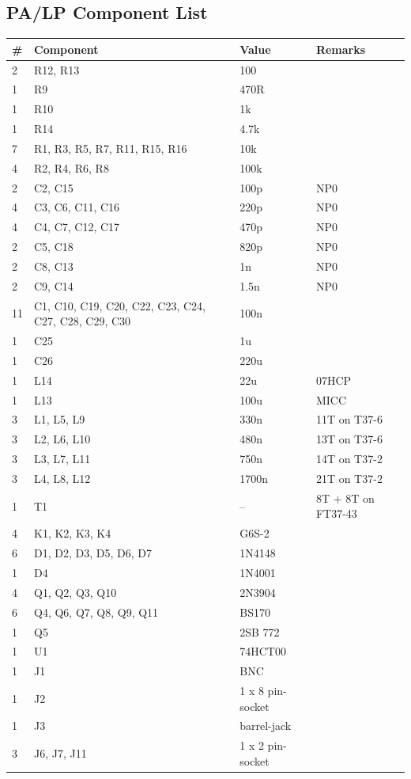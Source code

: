 \documentclass[10pt, a4paper,twoside]{scrartcl}
\begin{document}
\subsection{PA/LP Component List}  \label{sec:pacomp}
\begin{longtable}{|l|p{6cm}|l|l|} \hline 
\# & Component & Value & Remarks \\ \hline 
2 & R12, R13 & 100 & \\
1 & R9 & 470R & \\
1 & R10 & 1k & \\
1 & R14 & 4.7k & \\
7 & R1, R3, R5, R7, R11, R15, R16 & 10k & \\
4 & R2, R4, R6, R8 & 100k & \\
2 & C2, C15 & 100p & NP0 \\
4 & C3, C6, C11, C16 & 220p & NP0 \\
4 & C4, C7, C12, C17 & 470p & NP0 \\
2 & C5, C18 & 820p & NP0 \\
2 & C8, C13 & 1n & NP0 \\
2 & C9, C14 & 1.5n & NP0 \\
11 & C1, C10, C19, C20, C22, C23, C24, C27, C28, C29, C30 & 100n & \\
1 & C25 & 1u & \\
1 & C26 & 220u & \\
1 & L14 & 22u & 07HCP \\
1 & L13 & 100u & MICC \\
3 & L1, L5, L9 & 330n & 11T on T37-6 \\
3 & L2, L6, L10 & 480n & 13T on T37-6 \\
3 & L3, L7, L11 & 750n & 14T on T37-2 \\
3 & L4, L8, L12 & 1700n & 21T on T37-2 \\
1 & T1 & -- & 8T + 8T on FT37-43 \\
4 & K1, K2, K3, K4 & G6S-2 & \\
6 & D1, D2, D3, D5, D6, D7 & 1N4148 & \\
1 & D4 & 1N4001 & \\	
4 & Q1, Q2, Q3, Q10 & 2N3904 & \\
6 & Q4, Q6, Q7, Q8, Q9, Q11 & BS170 & \\
1 & Q5 & 2SB 772 & \\
1 & U1 & 74HCT00 & \\
1 & J1 & BNC & \\
1 & J2 & 1 x 8 pin-socket & \\
1 & J3 & barrel-jack & \\
3 & J6, J7, J11 & 1 x 2 pin-socket & \\ \hline
\end{longtable}
\end{document}

